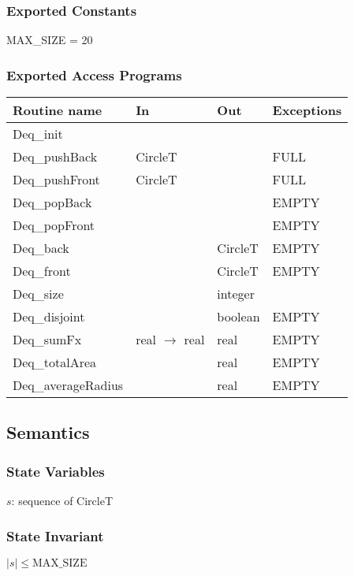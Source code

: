 \documentclass[12pt,fleqn]{article}
\begin{document}
\subsubsection* {Exported Constants}

MAX\_SIZE = 20

\subsubsection* {Exported Access Programs}

\begin{tabular}{| l | l | l | l |}
\hline
\textbf{Routine name} & \textbf{In} & \textbf{Out} & \textbf{Exceptions}\\
\hline
Deq\_init & ~ & ~ & ~\\
\hline
Deq\_pushBack & CircleT & ~ & FULL\\
\hline
Deq\_pushFront & CircleT & ~ & FULL\\
\hline
Deq\_popBack & ~ & ~ & EMPTY\\
\hline
Deq\_popFront & ~ & ~ & EMPTY\\
\hline
Deq\_back & ~ & CircleT & EMPTY\\
\hline
Deq\_front & ~ & CircleT & EMPTY\\
\hline
Deq\_size & ~ & integer & ~\\
\hline
Deq\_disjoint & ~ & boolean & EMPTY\\
\hline
Deq\_sumFx & real $\rightarrow$ real & real & EMPTY\\
\hline
Deq\_totalArea & ~ & real & EMPTY\\
\hline
Deq\_averageRadius & ~ & real & EMPTY\\
\hline

\end{tabular}

\subsection* {Semantics}

\subsubsection* {State Variables}
$s$: sequence of CircleT

\subsubsection* {State Invariant}
$| s | \leq \mbox{MAX\_SIZE}$
\end{document}
